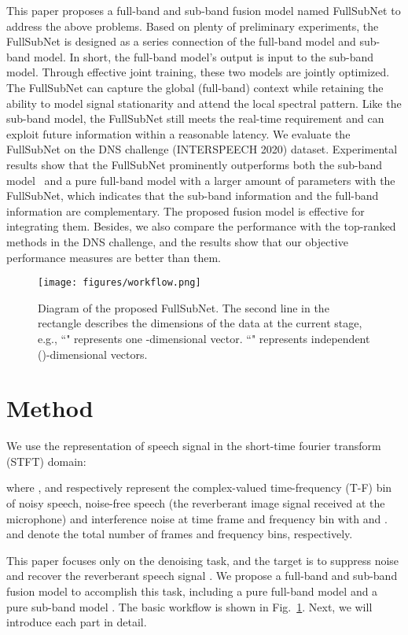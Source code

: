 \documentclass{article}
\begin{document}
This paper proposes a full-band and sub-band fusion model named FullSubNet to address the above problems. 
Based on plenty of preliminary experiments, the FullSubNet is designed as a series connection of the full-band model and sub-band model. In short, the full-band model's output is input to the sub-band model. 
Through effective joint training, these two models are jointly optimized.
The FullSubNet can capture the global (full-band) context while retaining the ability to model signal stationarity and attend the local spectral pattern. 
Like the sub-band model, the FullSubNet still meets the real-time requirement and can exploit future information within a reasonable latency.
We evaluate the FullSubNet on the DNS challenge (INTERSPEECH 2020) dataset. Experimental results show that the FullSubNet prominently outperforms both the sub-band model~\cite{sub_dns_xiaofeili} and a pure full-band model with a larger amount of parameters with the FullSubNet, which indicates that the sub-band information and the full-band information are complementary. The proposed fusion model is effective for integrating them. Besides, we also compare the performance with the top-ranked methods in the DNS challenge, and the results show that our objective performance measures are better than them.

\begin{figure}[!t]
    \centering
    \centerline{\texttt{[image: figures/workflow.png]}}
    \caption{Diagram of the proposed FullSubNet. The second line in the rectangle describes the dimensions of the data at the current stage, e.g., ``" represents one -dimensional vector. ``" represents  independent ()-dimensional vectors.}
    \label{fig:workflow}
\end{figure}


\section{Method}
\label{sec:method}

We use the representation of speech signal in the short-time fourier transform (STFT) domain:

where ,  and  respectively represent the complex-valued time-frequency (T-F) bin of noisy speech, noise-free speech (the reverberant image signal received at the microphone) and interference noise at time frame  and frequency bin  with  and .  and  denote the total number of frames and frequency bins, respectively.

This paper focuses only on the denoising task, and the target is to suppress noise  and recover the reverberant speech signal .
We propose a full-band and sub-band fusion model to accomplish this task, including a pure full-band model  and a pure sub-band model . The basic workflow is shown in Fig.~\ref{fig:workflow}.
Next, we will introduce each part in detail.
\end{document}
